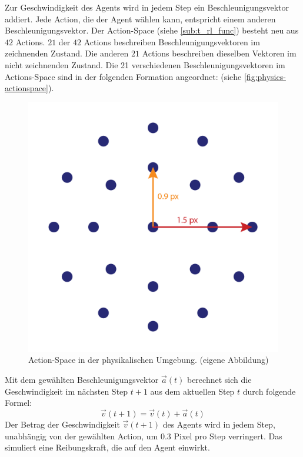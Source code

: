Zur Geschwindigkeit des Agents wird in jedem Step ein Beschleunigungsvektor
addiert. Jede Action, die der Agent wählen kann, entspricht einem anderen
Beschleunigungsvektor. Der Action-Space (siehe \ref{sub:t_rl_func})
besteht neu aus $42$ Actions. $21$ der $42$ Actions beschreiben
Beschleunigungsvektoren im zeichnenden Zustand. Die anderen $21$ Actions
beschreiben dieselben Vektoren im nicht zeichnenden Zustand. Die 21
verschiedenen Beschleunigungsvektoren im Actions-Space sind in der folgenden
Formation angeordnet: (siehe \autoref{fig:physics-actionspace}).
 
\begin{figure}[!ht]
 \centering
 \includegraphics[width=\textwidth-6cm]{images/methode/physics-actionspace.png}
 \caption{Action-Space in der physikalischen Umgebung. (eigene Abbildung)}\label{fig:physics-actionspace}
\end{figure}
 
Mit dem gewählten Beschleunigungsvektor $\vec{a}(t)$ berechnet sich die
Geschwindigkeit im nächsten Step $t+1$ aus dem aktuellen Step $t$ durch folgende
Formel:
\[ \vec{v}(t+1) = \vec{v}(t) + \vec{a}(t) \] Der Betrag der Geschwindigkeit
$\vec{v}(t+1)$ des Agents wird in jedem Step, unabhängig von der gewählten
Action, um $0.3$ Pixel pro Step verringert. Das simuliert eine Reibungskraft,
die auf den Agent einwirkt.

